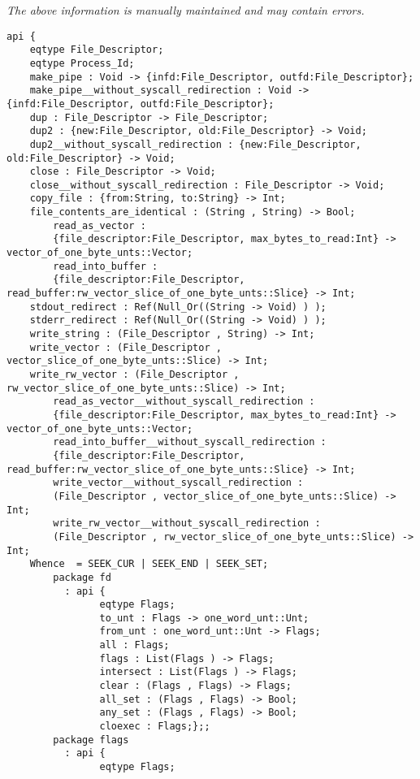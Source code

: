 \label{api:Posix\_Io}

{\tiny \it The above information is manually maintained and may contain errors.}
\begin{verbatim}
api {
    eqtype File_Descriptor;
    eqtype Process_Id;
    make_pipe : Void -> {infd:File_Descriptor, outfd:File_Descriptor};
    make_pipe__without_syscall_redirection : Void -> {infd:File_Descriptor, outfd:File_Descriptor};
    dup : File_Descriptor -> File_Descriptor;
    dup2 : {new:File_Descriptor, old:File_Descriptor} -> Void;
    dup2__without_syscall_redirection : {new:File_Descriptor, old:File_Descriptor} -> Void;
    close : File_Descriptor -> Void;
    close__without_syscall_redirection : File_Descriptor -> Void;
    copy_file : {from:String, to:String} -> Int;
    file_contents_are_identical : (String , String) -> Bool;
        read_as_vector :
        {file_descriptor:File_Descriptor, max_bytes_to_read:Int} -> vector_of_one_byte_unts::Vector;
        read_into_buffer :
        {file_descriptor:File_Descriptor, read_buffer:rw_vector_slice_of_one_byte_unts::Slice} -> Int;
    stdout_redirect : Ref(Null_Or((String -> Void) ) );
    stderr_redirect : Ref(Null_Or((String -> Void) ) );
    write_string : (File_Descriptor , String) -> Int;
    write_vector : (File_Descriptor , vector_slice_of_one_byte_unts::Slice) -> Int;
    write_rw_vector : (File_Descriptor , rw_vector_slice_of_one_byte_unts::Slice) -> Int;
        read_as_vector__without_syscall_redirection :
        {file_descriptor:File_Descriptor, max_bytes_to_read:Int} -> vector_of_one_byte_unts::Vector;
        read_into_buffer__without_syscall_redirection :
        {file_descriptor:File_Descriptor, read_buffer:rw_vector_slice_of_one_byte_unts::Slice} -> Int;
        write_vector__without_syscall_redirection :
        (File_Descriptor , vector_slice_of_one_byte_unts::Slice) -> Int;
        write_rw_vector__without_syscall_redirection :
        (File_Descriptor , rw_vector_slice_of_one_byte_unts::Slice) -> Int;
    Whence  = SEEK_CUR | SEEK_END | SEEK_SET;
        package fd
          : api {
                eqtype Flags;
                to_unt : Flags -> one_word_unt::Unt;
                from_unt : one_word_unt::Unt -> Flags;
                all : Flags;
                flags : List(Flags ) -> Flags;
                intersect : List(Flags ) -> Flags;
                clear : (Flags , Flags) -> Flags;
                all_set : (Flags , Flags) -> Bool;
                any_set : (Flags , Flags) -> Bool;
                cloexec : Flags;};;
        package flags
          : api {
                eqtype Flags;

\end{verbatim}
